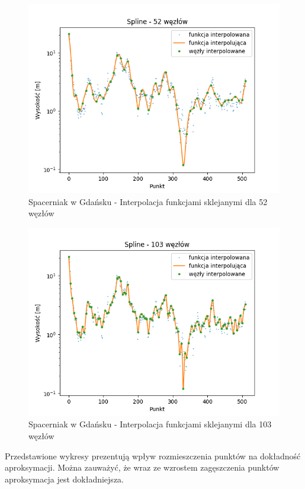 \documentclass[12pt]{extarticle}
\begin{document}
\begin{figure}[H]
    \centering
    \includegraphics[scale=0.8]{interpolation_SpacerniakGdansk_Spline_52.png}
    \caption{Spacerniak w Gdańsku - Interpolacja funkcjami sklejanymi dla 52 węzłów}
\end{figure}
\begin{figure}[H]
    \centering
    \includegraphics[scale=0.8]{interpolation_SpacerniakGdansk_Spline_103.png}
    \caption{Spacerniak w Gdańsku - Interpolacja funkcjami sklejanymi dla 103 węzłów}
\end{figure}
Przedstawione wykresy prezentują wpływ rozmieszczenia punktów na dokładność aproksymacji. Można zauważyć, że wraz ze wzrostem zagęszczenia punktów aproksymacja jest dokładniejsza.
\end{document}
